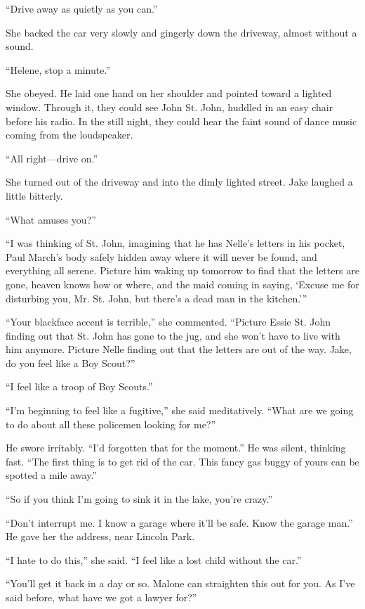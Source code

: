 \documentclass{novel}
\begin{document}
“Drive away as quietly as you can.”

She backed the car very slowly and gingerly down the driveway, almost without a sound.

“Helene, stop a minute.”

She obeyed. He laid one hand on her shoulder and pointed toward a lighted window. Through it, they could see John St. John, huddled in an easy chair before his radio. In the still night, they could hear the faint sound of dance music coming from the loudspeaker.

“All right—drive on.”

She turned out of the driveway and into the dimly lighted street. Jake laughed a little bitterly.

“What amuses you?”

“I was thinking of St. John, imagining that he has Nelle’s letters in his pocket, Paul March’s body safely hidden away where it will never be found, and everything all serene. Picture him waking up tomorrow to find that the letters are gone, heaven knows how or where, and the maid coming in saying, ‘Excuse me for disturbing you, Mr. St. John, but there's a dead man in the kitchen.’”

“Your blackface accent is terrible,” she commented. “Picture Essie St. John finding out that St. John has gone to the jug, and she won’t have to live with him anymore. Picture Nelle finding out that the letters are out of the way. Jake, do you feel like a Boy Scout?”

“I feel like a troop of Boy Scouts.”

“I’m beginning to feel like a fugitive,” she said meditatively. “What are we going to do about all these policemen looking for me?”

He swore irritably. “I’d forgotten that for the moment.” He was silent, thinking fast. “The first thing is to get rid of the car. This fancy gas buggy of yours can be spotted a mile away.”

“So if you think I’m going to sink it in the lake, you’re crazy.”

“Don’t interrupt me. I know a garage where it’ll be safe. Know the garage man.” He gave her the address, near Lincoln Park.

“I hate to do this,” she said. “I feel like a lost child without the car.”

“You’ll get it back in a day or so. Malone can straighten this out for you. As I’ve said before, what have we got a lawyer for?”
\end{document}
